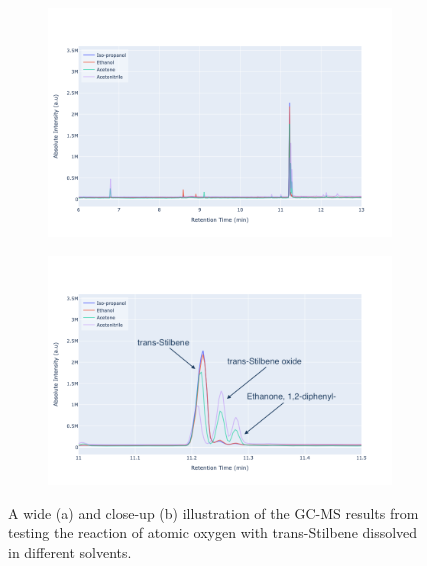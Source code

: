 \begin{figure}
    \centering
    \begin{subfigure}[b]{\textwidth}
        \centering
        \includegraphics[width=\textwidth]{chapter_6/figures/solvent_test.png}
        \caption{}
        \label{fig:solvent_test}
    \end{subfigure}
    \hfill
    \begin{subfigure}[b]{\textwidth}  
        \centering 
        \includegraphics[width=\textwidth]{chapter_6/figures/solvent_test_close_up.png}
        \caption{}
        \label{fig:solvent_test_close_up}
    \end{subfigure}

    \caption{\small A wide (a) and close-up (b) illustration of the GC-MS results from testing the reaction of atomic oxygen with trans-Stilbene dissolved in different solvents.} 
    \label{fig:solvent_test_results}
\end{figure}

